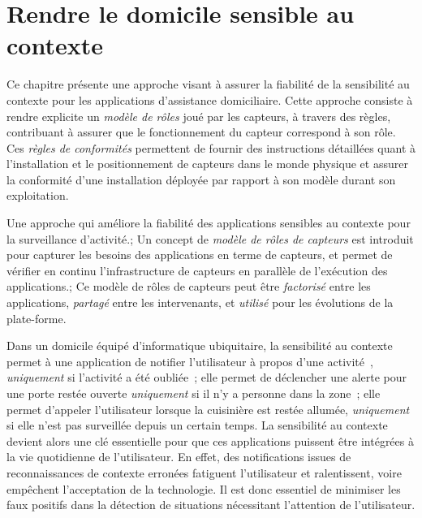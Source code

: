 \chapter{Rendre le domicile sensible au contexte}\label{cha:fiabilite} 
\begin{preamble}
Ce chapitre présente une approche visant à assurer la fiabilité de la sensibilité au contexte pour les applications d'assistance domiciliaire. 
Cette approche consiste à rendre explicite un {\em modèle de rôles} joué par les capteurs, à travers des règles, contribuant à assurer que le fonctionnement du capteur correspond à son rôle. Ces {\em règles de conformités} permettent de fournir des instructions détaillées quant à l'installation et le positionnement de capteurs dans le monde physique et assurer la conformité d'une installation déployée par rapport à son modèle durant son exploitation\footnotemark{}.
\end{preamble}
{
  Une approche qui améliore la fiabilité des applications sensibles au contexte pour la surveillance d'activité.;
  Un concept de {\em modèle de rôles de capteurs} est introduit pour capturer les besoins des applications en terme de capteurs, et permet de vérifier en continu l'infrastructure de capteurs en parallèle de l'exécution des applications.;
  Ce modèle de rôles de capteurs peut être {\em factorisé} entre les applications, {\em partagé} entre les intervenants, et {\em utilisé} pour les évolutions de la plate-forme.
}

Dans un domicile équipé d'informatique ubiquitaire, la sensibilité au contexte 
permet à une application de notifier l'utilisateur à propos d'une 
activité~, {\em uniquement} si l'activité a été 
oubliée~; elle permet de déclencher une alerte pour une porte restée ouverte 
{\em uniquement} si il n'y a personne dans la zone~; elle permet d'appeler 
l'utilisateur lorsque la cuisinière est restée allumée, {\em uniquement} 
si elle n'est pas surveillée depuis un certain temps.
La sensibilité au contexte devient alors une clé essentielle pour que ces 
applications puissent être intégrées à la vie
quotidienne de l'utilisateur. En effet, 
des notifications issues de reconnaissances de contexte erronées fatiguent 
l'utilisateur et ralentissent, voire empêchent l'acceptation de la technologie.
Il est donc essentiel de minimiser les faux positifs dans la détection de 
situations nécessitant l'attention de l'utilisateur. 

